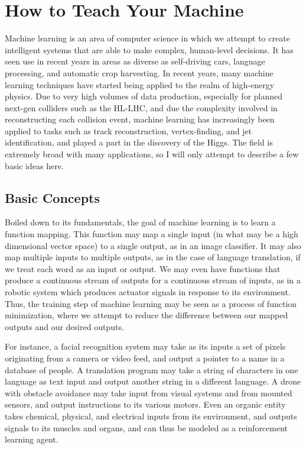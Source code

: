 \chapter{How to Teach Your Machine}

Machine learning is an area of computer science in which we attempt to create intelligent systems that are able to make complex, human-level decisions. It has seen use in recent years in areas as diverse as self-driving cars, language processing, and automatic crop harvesting. In recent years, many machine learning techniques have started being applied to the realm of high-energy physics. Due to very high volumes of data production, especially for planned next-gen colliders such as the HL-LHC, and due the complexity involved in reconstructing each collision event, machine learning has increasingly been applied to tasks such as track reconstruction, vertex-finding, and jet identification, and played a part in the discovery of the Higgs. The field is extremely broad with many applications, so I will only attempt to describe a few basic ideas here.

\section{Basic Concepts}

Boiled down to its fundamentals, the goal of machine learning is to learn a function mapping. This function may map a single input (in what may be a high dimensional vector space) to a single output, as in an image classifier. It may also map multiple inputs to multiple outputs, as in the case of language translation, if we treat each word as an input or output. We may even have functions that produce a continuous stream of outputs for a continuous stream of inputs, as in a robotic system which produces actuator signals in response to its environment. Thus, the training step of machine learning may be seen as a process of function minimization, where we attempt to reduce the difference between our mapped outputs and our desired outputs.

For instance, a facial recognition system may take as its inputs a set of pixels originating from a camera or video feed, and output a pointer to a name in a database of people. A translation program may take a string of characters in one language as text input and output another string in a different language. A drone with obstacle avoidance may take input from visual systems and from mounted sensors, and output instructions to its various motors. Even an organic entity takes chemical, physical, and electrical inputs from its environment, and outputs signals to its muscles and organs, and can thus be modeled as a reinforcement learning agent.

